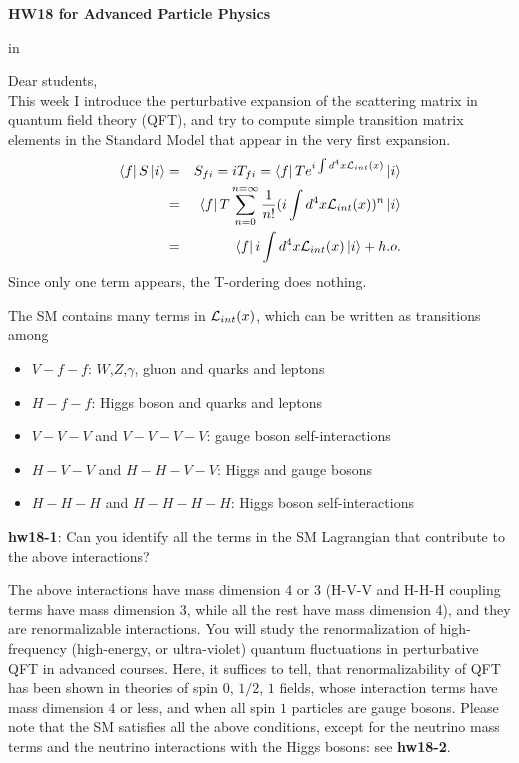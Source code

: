 \documentclass[12pt]{article}
\begin{document}
\begin{center}
{\large\bf HW18 for Advanced Particle Physics} \\

\end{center}

 in

Dear students,\\
This week I introduce the perturbative expansion of
the scattering matrix in quantum field theory (QFT), and try to
compute simple transition matrix elements in the Standard Model
that appear in the very first expansion.
\begin{eqnarray}
    \bra{f}S\ket{i}&=& S_{fi} = i T_{fi}=\bra{f}T e^{i\int d^4x {\cal L}_{int}(x)} \ket{i} \\ 
    &=& \bra{f}T \sum_{n=0}^{n=\infty}\frac{1}{n!} (i\int d^4x {\cal L}_{int}(x))^n \ket{i} \\
    &=& \bra{f}i\int d^4x {\cal L}_{int}(x) \ket{i} +h.o. \label{eq.18_1}
\end{eqnarray}
Since only one term appears, the T-ordering does nothing.

The SM contains many terms in ${\cal L}_{int}(x)$, which can be written
as transitions among
\begin{itemize}
    \item $V-f-f$: $W$,$Z$,$\gamma$, gluon and quarks and leptons
    \item $H-f-f$: Higgs boson and quarks and leptons
    \item $V-V-V$ and $V-V-V-V$: gauge boson self-interactions
    \item $H-V-V$ and $H-H-V-V$: Higgs and gauge bosons
    \item $H-H-H$ and $H-H-H-H$: Higgs boson self-interactions
\end{itemize}

{\bf hw18-1}: Can you identify all the terms in the SM Lagrangian that
contribute to the above interactions?

The above interactions have mass dimension 4 or 3 (H-V-V and H-H-H
coupling terms have mass dimension 3, while all the rest have mass
dimension 4), and they are renormalizable interactions.  You will
study the renormalization of high-frequency (high-energy, or
ultra-violet) quantum fluctuations in perturbative QFT in advanced
courses.  Here, it suffices to tell, that renormalizability of QFT
has been shown in theories of spin $0$, $1/2$, $1$ fields, whose interaction
terms have mass dimension $4$ or less, and when all spin $1$ particles
are gauge bosons. Please note that the SM satisfies all the above
conditions, except for the neutrino mass terms and the neutrino
interactions with the Higgs bosons: see {\bf hw18-2}.
\end{document}
